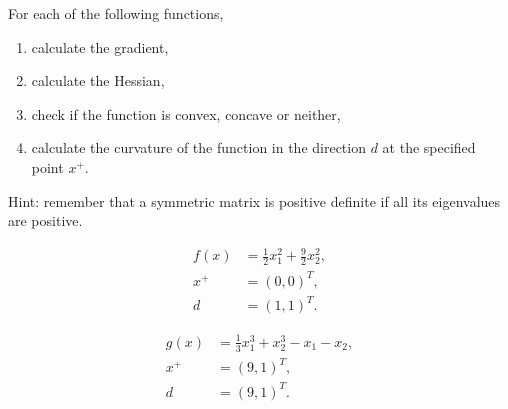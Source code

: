 
For each of the following functions,
\begin{enumerate}
\item calculate the gradient,
\item calculate the Hessian,
\item check if the function is convex, concave or neither,
\item calculate the curvature of the function in the direction $d$ at the specified point $x^+$.
\end{enumerate}

Hint: remember that a symmetric matrix is positive definite if all its
eigenvalues are positive.


\begin{align*}
  f(x)&=\frac{1}{2}x_1^2+\frac{9}{2}x_2^2,\\
  x^+ &=(0,0)^T,\\
  d&=(1,1)^T.
\end{align*}

\begin{align*}
  g(x)& =\frac{1}{3}x_1^3+x_2^3-x_1-x_2,\\
  x^+&=(9,1)^T,\\
  d&=(9,1)^T.
\end{align*}


